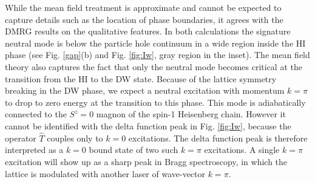 \documentclass[prb,twocolumn,,amsmath,amssymb,floatfix]{revtex4}
\begin{document}
While the mean field treatment is approximate and cannot be expected
to capture details such as the location of phase boundaries,
it agrees with the DMRG results on the qualitative features.
In both calculations the signature neutral mode
is below the particle hole continuum in a wide region
inside the HI phase (see Fig. \ref{gap}(b) and Fig. \ref{fig:Iw}, gray region in the inset).
The mean field theory also captures
the fact that only the neutral mode
becomes critical at the transition from the HI to the DW state.
Because of the lattice symmetry breaking in the DW phase,
we expect a neutral excitation with momentum
$k=\pi$ to drop to zero energy at the transition to this phase.
This mode is adiabatically connected to the $S^z=0$ magnon of
the spin-1 Heisenberg chain. However it cannot be identified with the
delta function peak in
Fig. \ref{fig:Iw},
because the operator $\hat T$ couples only to
$k=0$ excitations. The delta function peak is therefore
interpreted as a $k=0$ bound state of two such $k=\pi$ excitations.
A single $k=\pi$ excitation will show up as a sharp peak
in Bragg spectroscopy\cite{Stenger}, in which the lattice is modulated with another laser
of wave-vector $k=\pi$.

\end{document}
